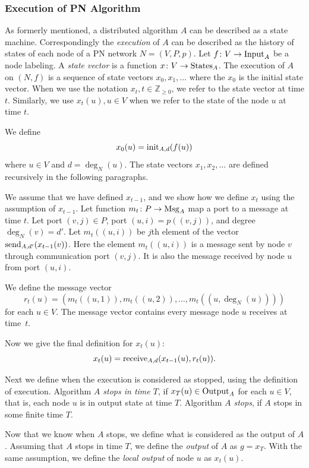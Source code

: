 \subsubsection{Execution of PN Algorithm}

As formerly mentioned, a distributed algorithm $A$ can be described as a state machine.
Correspondingly the \emph{execution} of $A$ can be described as the history of states of each node of a PN network $N=(V, P, p)$.
Let $f\colon V \rightarrow \operatorname{Input}_A$ be a node labeling.
A \emph{state vector} is a function $x\colon V \rightarrow \operatorname{States}_A$.
The execution of $A$ on $(N, f)$ is a sequence of state vectors $x_0, x_1, \dotsc$ where the $x_0$ is the initial state vector.
When we use the notation $x_t, t \in \mathbb{Z}_{\geq 0}$, we refer to the state vector at time $t$.
Similarly, we use $x_t(u), u \in V$ when we refer to the state of the node $u$ at time $t$.

We define \[ x_0(u) = \operatorname{init}_{A,d}(f(u)) \] where $u\in V$ and $d=\deg_N(u)$.
The state vectors $x_1, x_2, \dotsc$ are defined recursively in the following paragraphs.

We assume that we have defined $x_{t-1}$, and we show how we define $x_{t}$ using the assumption of $x_{t-1}$.
Let function $m_t\colon P \rightarrow \operatorname{Msg}_A$ map a port to a message at time $t$.
Let port $(v, j) \in P$, port $(u, i) = p((v, j))$, and degree $\deg_N(v) = d'$.
Let $m_t((u, i))$ be $j$th element of the vector $\operatorname{send}_{A, d'}(x_{t-1}(v))$.
Here the element $m_t((u, i))$ is a message sent by node $v$ through communication port $(v, j)$.
It is also the message received by node $u$ from port $(u, i)$.

We define the message vector \[ r_t(u)=(m_t((u, 1)), m_t((u, 2)), \dotsc, m_t((u, \deg_N(u)))) \] for each $u\in V$.
The message vector contains every message node $u$ receives at time~$t$.

Now we give the final definition for $x_t(u)$:
\[ x_t(u) = \operatorname{receive}_{A,d}(x_{t-1}(u), r_t(u)). \]

Next we define when the execution is considered as stopped, using the definition of execution.
Algorithm \emph{$A$ stops in time $T$}, if $x_T(u) \in \operatorname{Output}_A$ for each $u \in V$, that is, each node $u$ is in output state at time $T$.
Algorithm \emph{$A$ stops}, if $A$ stops in some finite time $T$.


Now that we know when $A$ stops, we define what is considered as the output of $A$.
Assuming that $A$ stops in time $T$, we define the \emph{output} of $A$ as $g=x_T$.
With the same assumption, we define the \emph{local output} of node $u$ as $x_t(u)$.


